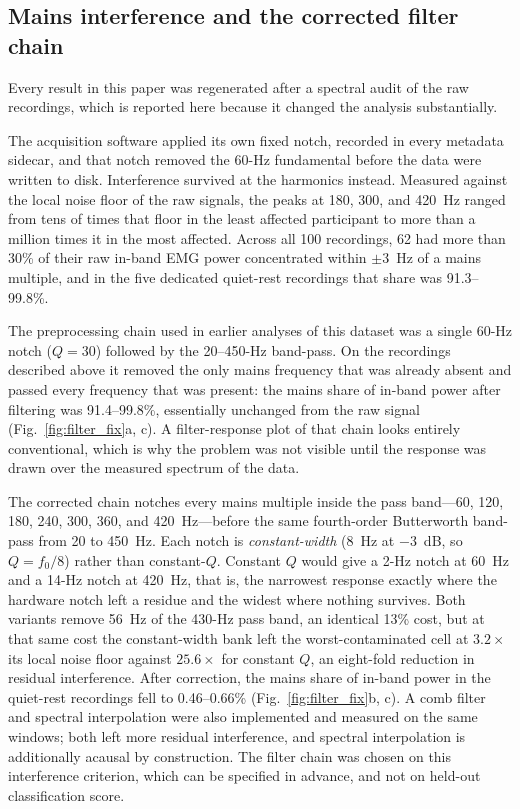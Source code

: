\documentclass[pdflatex,sn-nature,iicol]{sn-jnl}
\begin{document}
\subsection{Mains interference and the corrected filter chain}

Every result in this paper was regenerated after a spectral audit of the raw recordings, which is reported here because it changed the analysis substantially.

The acquisition software applied its own fixed notch, recorded in every metadata sidecar, and that notch removed the 60-Hz fundamental before the data were written to disk. Interference survived at the harmonics instead. Measured against the local noise floor of the raw signals, the peaks at 180, 300, and 420~Hz ranged from tens of times that floor in the least affected participant to more than a million times it in the most affected. Across all 100 recordings, 62 had more than 30\% of their raw in-band EMG power concentrated within $\pm 3$~Hz of a mains multiple, and in the five dedicated quiet-rest recordings that share was 91.3--99.8\%.

The preprocessing chain used in earlier analyses of this dataset was a single 60-Hz notch ($Q=30$) followed by the 20--450-Hz band-pass. On the recordings described above it removed the only mains frequency that was already absent and passed every frequency that was present: the mains share of in-band power after filtering was 91.4--99.8\%, essentially unchanged from the raw signal (Fig.~\ref{fig:filter_fix}a, c). A filter-response plot of that chain looks entirely conventional, which is why the problem was not visible until the response was drawn over the measured spectrum of the data.

The corrected chain notches every mains multiple inside the pass band---60, 120, 180, 240, 300, 360, and 420~Hz---before the same fourth-order Butterworth band-pass from 20 to 450~Hz. Each notch is \emph{constant-width} (8~Hz at $-3$~dB, so $Q = f_0/8$) rather than constant-$Q$. Constant $Q$ would give a 2-Hz notch at 60~Hz and a 14-Hz notch at 420~Hz, that is, the narrowest response exactly where the hardware notch left a residue and the widest where nothing survives. Both variants remove 56~Hz of the 430-Hz pass band, an identical 13\% cost, but at that same cost the constant-width bank left the worst-contaminated cell at $3.2\times$ its local noise floor against $25.6\times$ for constant $Q$, an eight-fold reduction in residual interference. After correction, the mains share of in-band power in the quiet-rest recordings fell to 0.46--0.66\% (Fig.~\ref{fig:filter_fix}b, c). A comb filter and spectral interpolation were also implemented and measured on the same windows; both left more residual interference, and spectral interpolation is additionally acausal by construction. The filter chain was chosen on this interference criterion, which can be specified in advance, and not on held-out classification score.
\end{document}
